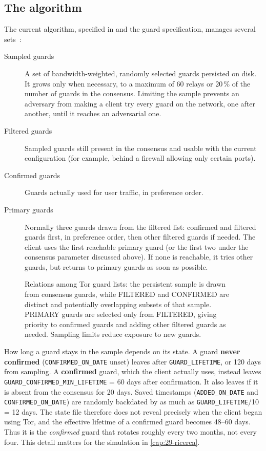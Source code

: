 \subsection{The algorithm}

The current algorithm, specified in  and the guard specification, manages several sets~:
\begin{description}
  \item[Sampled guards] A set of bandwidth-weighted, randomly selected guards persisted on disk. It grows only when necessary, to a maximum of 60 relays or 20\,\% of the number of guards in the consensus. Limiting the sample prevents an adversary from making a client try every guard on the network, one after another, until it reaches an adversarial one.
  \item[Filtered guards] Sampled guards still present in the consensus and usable with the current configuration (for example, behind a firewall allowing only certain ports).
  \item[Confirmed guards] Guards actually used for user traffic, in preference order.
  \item[Primary guards] Normally three guards drawn from the filtered list: confirmed and filtered guards first, in preference order, then other filtered guards if needed. The client uses the first reachable primary guard (or the first two under the consensus parameter discussed above). If none is reachable, it tries other guards, but returns to primary guards as soon as possible.
\end{description}
\begin{figure}[htbp]
\centering

\caption{Relations among Tor guard lists: the persistent sample is drawn from consensus guards, while FILTERED and CONFIRMED are distinct and potentially overlapping subsets of that sample. PRIMARY guards are selected only from FILTERED, giving priority to confirmed guards and adding other filtered guards as needed. Sampling limits reduce exposure to new guards.}
\label{fig:guard}
\end{figure}

How long a guard stays in the sample depends on its state. A guard \textbf{never confirmed} (\texttt{CONFIRMED\_ON\_DATE} unset) leaves after \texttt{GUARD\_LIFETIME}, or 120 days from sampling. A \textbf{confirmed} guard, which the client actually uses, instead leaves \texttt{GUARD\_CONFIRMED\_MIN\_LIFETIME} = 60 days after confirmation. It also leaves if it is absent from the consensus for 20 days. Saved timestamps (\texttt{ADDED\_ON\_DATE} and \texttt{CONFIRMED\_ON\_DATE}) are randomly backdated by as much as \texttt{GUARD\_LIFETIME}/10 = 12 days. The state file therefore does not reveal precisely when the client began using Tor, and the effective lifetime of a confirmed guard becomes 48--60 days. Thus it is the \emph{confirmed} guard that rotates roughly every two months, not every four. This detail matters for the simulation in \cref{cap:29-ricerca}.

